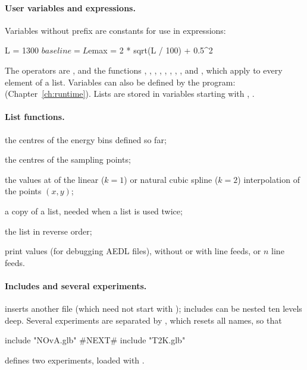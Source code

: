 \paragraph{User variables and expressions.}\label{sec:aedl-variables}
Variables without prefix are constants for use in expressions:
\begin{aedl}
L = 1300
$baseline = L
$emax = 2 * sqrt(L / 100) + 0.5^2
\end{aedl}
The operators are \code{+ - * / \^}, and the functions , ,
, , , , , ,
 and , which apply to every element of a list. Variables
can also be defined by the program: 
(Chapter~\ref{ch:runtime}). Lists are stored in variables starting with
\code{\%}, .

\paragraph{List functions.}
\begin{description}[style=nextline,leftmargin=3cm]
\item[\code{bincenter()}] the centres of the energy bins defined so far;
\item[\code{samplingbincenter()}] the centres of the sampling points;
\item[\code{interpolation(x, y, k, z)}] the values at  of the linear
  ($k=1$) or natural cubic spline ($k=2$) interpolation of the points
  $(x, y)$;
\item[\code{copy(l)}] a copy of a list, needed when a list is used twice;
\item[\code{reverse(l)}] the list in reverse order;
\item[\code{echo(x)}, \code{echon(x)}, \code{line(n)}] print values (for
  debugging AEDL files), without or with line feeds, or $n$ line feeds.
\end{description}

\paragraph{Includes and several experiments.} 
inserts another file (which need not start with ); includes
can be nested ten levels deep. Several experiments are separated by
, which resets all names, so that
\begin{aedl}
include "NOvA.glb"
#NEXT#
include "T2K.glb"
\end{aedl}
defines two experiments, loaded with .

